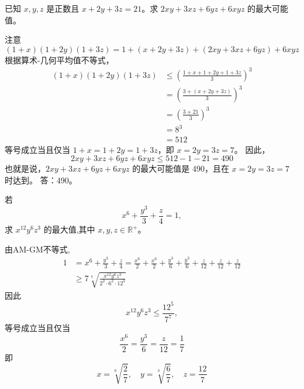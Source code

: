\begin{questions}
    \question 已知 $x, y, z$ 是正数且 $x + 2y + 3z = 21$。求 $2xy + 3xz + 6yz + 6xyz$ 的最大可能值。

\begin{solution}
注意
\[
(1 + x)(1 + 2y)(1 + 3z) = 1 + (x + 2y + 3z) + (2xy + 3xz + 6yz) + 6xyz
\]
根据算术-几何平均值不等式，
\begin{align*}
(1 + x)(1 + 2y)(1 + 3z) &\le \left( \frac{1 + x + 1 + 2y + 1 + 3z}{3} \right)^3 \\
&= \left( \frac{3 + (x + 2y + 3z)}{3} \right)^3 \\
&= \left( \frac{3 + 21}{3} \right)^3 \\
&= 8^3 \\
&= 512
\end{align*}
等号成立当且仅当 $1 + x = 1 + 2y = 1 + 3z$，即 $x = 2y = 3z = 7$。
因此，
\[
2xy + 3xz + 6yz + 6xyz \le 512 - 1 - 21 = 490
\]
也就是说，$2xy + 3xz + 6yz + 6xyz$ 的最大可能值是 490，且在 $x = 2y = 3z = 7$ 时达到。
答：490。
\end{solution}

    \question 若 
    \[
    x^6 + \frac{y^3}{3} + \frac{z}{4} = 1,
    \]
    求 $x^{12}y^6z^3$ 的最大值,其中 $x, y, z \in \mathbb{R}^{+}$。
    \begin{solution}
        由AM-GM不等式,
        \begin{align*}
        1 &= x^6 + \frac{y^3}{3} + \frac{z}{4} = \frac{x^6}{2} + \frac{x^6}{2} + \frac{y^3}{6} + \frac{y^3}{6} + \frac{z}{12} + \frac{z}{12} + \frac{z}{12} \\
        &\ge 7 \sqrt[7]{\frac{x^{12}y^6z^3}{2^2 \cdot 6^2 \cdot 12^3}}
        \end{align*}
        因此
        \[
        x^{12}y^6z^3 \le \frac{12^5}{7^7},
        \]
        等号成立当且仅当
        \[
        \frac{x^6}{2} = \frac{y^3}{6} = \frac{z}{12} = \frac{1}{7}
        \]
        即
        \[
        x = \sqrt[6]{\frac{2}{7}}, \quad y = \sqrt[3]{\frac{6}{7}}, \quad z = \frac{12}{7}
        \]
    \end{solution}


\end{questions}
